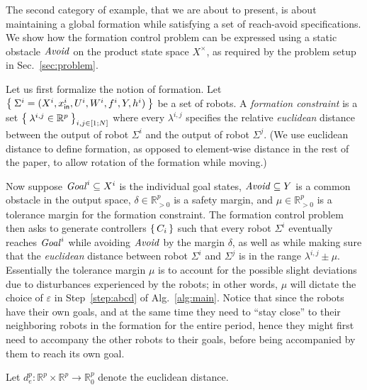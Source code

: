 The second category of example, that we are about to present, is about maintaining a global formation while satisfying a set of reach-avoid specifications.
We show how the formation control problem can be expressed using a static obstacle $\mathit{Avoid}$ on the product state space $X^\times$, as required by the problem setup in Sec.~\ref{sec:problem}.

Let us first formalize the notion of formation.
Let $\Set{\Sigma^i=(X^i,x_{\mathsf{in}}^i,U^i,W^i,f^i,Y,h^i)}$ be a set of robots.
A \emph{formation constraint} is a set $\Set{\lambda^{i,j}\in \mathbb{R}^p}_{i,j\in [1;N]}$ where every $\lambda^{i,j}$ specifies the relative \emph{euclidean} distance between the output of robot $\Sigma^i$ and the output of robot $\Sigma^j$.
(We use euclidean distance to define formation, as opposed to element-wise distance in the rest of the paper, to allow rotation of the formation while moving.)

Now suppose $\mathit{Goal}^i\subseteq X^i$ is the individual goal states, $\mathit{Avoid}\subseteq Y$ is a common obstacle in the output space, $\delta \in \mathbb{R}^p_{>0}$ is a safety margin, and $\mu\in \mathbb{R}^p_{>0}$ is a tolerance margin for the formation constraint.
The formation control problem then asks to generate controllers $\set{C_i}$ such that every robot $\Sigma^i$ eventually reaches $\mathit{Goal}^i$ while avoiding $\mathit{Avoid}$ by the margin $\delta$, as well as while making sure that the \emph{euclidean} distance between robot $\Sigma^i$ and $\Sigma^j$ is in the range $\lambda^{i,j} \pm \mu$.
Essentially the tolerance margin $\mu$ is to account for the possible slight deviations due to disturbances experienced by the robots; in other words, $\mu$ will dictate the choice of $\varepsilon$ in Step~\ref{step:abcd} of Alg.~\ref{alg:main}.
Notice that since the robots have their own goals, and at the same time they need to ``stay close'' to their neighboring robots in the formation for the entire period, hence they might first need to accompany the other robots to their goals, before being accompanied by them to reach its own goal.

Let $d_e^p\colon \mathbb{R}^p\times \mathbb{R}^p\to \mathbb{R}^p_0$ denote the euclidean distance.

